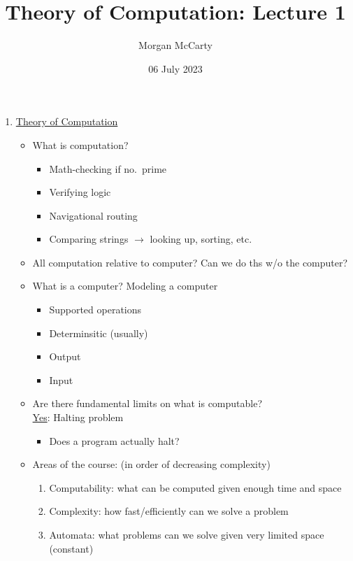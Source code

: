 \documentclass[12pt]{article}
\title{
    Theory of Computation: Lecture 1}
\author{Morgan McCarty}
\date{06 July 2023}
\begin{document}
    \maketitle

    \begin{enumerate}
        \item \underline{Theory of Computation}
        \begin{itemize}
            \item What is computation?
            \begin{itemize}
                \item Math-checking if no.\ prime
                \item Verifying logic
                \item Navigational routing
                \item Comparing strings $\rightarrow$ looking up, sorting, etc.\ 
            \end{itemize}
            \item All computation relative to computer? Can we do ths w/o the computer?
            \item What is a computer? Modeling a computer
            \begin{itemize}
                \item Supported operations
                \item Determinsitic (usually)
                \item Output
                \item Input
            \end{itemize}
            \item Are there fundamental limits on what is computable? \\
                \underline{Yes}: Halting problem
            \begin{itemize}
                \item Does a program actually halt?
            \end{itemize}
            \item Areas of the course: (in order of decreasing complexity)
            \begin{enumerate}
                \item Computability: what can be computed given enough time and space
                \item Complexity: how fast/efficiently can we solve a problem
                \item Automata: what problems can we solve given very limited space (constant)

\end{enumerate}
\end{itemize}
\end{enumerate}
\end{document}
